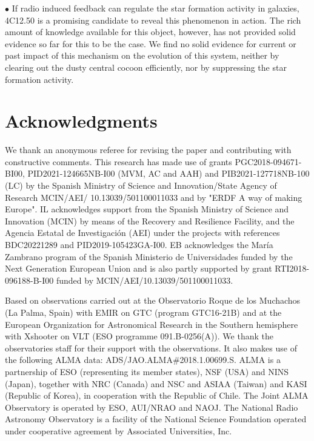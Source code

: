 \documentclass{aa}
\begin{document}
$\bullet$ If radio induced feedback can regulate the star formation activity in galaxies, 4C12.50 is a promising candidate to reveal this phenomenon in action. The rich amount of knowledge available for this object, however, has not provided solid evidence so far for this to be the case.   We find   no solid evidence for current or past impact of this mechanism on the evolution of this system, neither by clearing out the dusty central cocoon efficiently, nor by suppressing the star formation activity.




\section*{Acknowledgments}

We thank an anonymous referee for revising the paper and contributing with constructive comments.
This research has made use of grants  PGC2018-094671-BI00, PID2021-124665NB-I00 (MVM, AC and AAH) and   PIB2021-127718NB-100 (LC)  by the Spanish Ministry of Science and Innovation/State Agency of Research MCIN/AEI/ 10.13039/501100011033 and by "ERDF A way of making Europe". IL acknowledges support from the Spanish Ministry of Science and Innovation (MCIN) by means of the Recovery and Resilience Facility, and the Agencia Estatal de Investigación (AEI) under the projects with references BDC20221289 and PID2019-105423GA-I00.  
EB acknowledges the María Zambrano program of the Spanish Ministerio de Universidades funded by the Next Generation European Union and is also partly supported by grant RTI2018-096188-B-I00 funded by MCIN/AEI/10.13039/501100011033.


Based on observations carried out at the Observatorio Roque de los Muchachos (La Palma, Spain) with EMIR on GTC (program GTC16-21B) and   at the European
Organization for Astronomical Research in the Southern hemisphere with Xshooter on VLT (ESO programme 091.B-0256(A)).
 We  thank the observatories staff for their support with the  observations.   It also makes use of  the following ALMA data: ADS/JAO.ALMA\#2018.1.00699.S. ALMA is a partnership of ESO (representing its member states), NSF (USA) and NINS (Japan), together with NRC (Canada) and NSC and ASIAA (Taiwan) and KASI (Republic of Korea), in cooperation with the Republic of Chile. The Joint ALMA Observatory is operated by ESO, AUI/NRAO and NAOJ. The National Radio Astronomy Observatory is a facility of the National Science Foundation operated under cooperative agreement by Associated Universities, Inc. 
\end{document}
